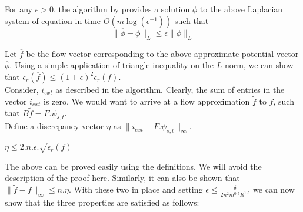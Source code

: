 \documentclass[BTech]{iitmdiss}
\begin{document}
	    \begin{thm2}
	      For any $\epsilon > 0$, the algorithm by \cite{DBLP:journals/corr/abs-1003-2958} provides a solution $\overline{\phi}$ to the above Laplacian
	      system of equation in time $\tilde{O}(m \log(\epsilon^{-1}))$ such that 
	      $$\| \overline{\phi} - \phi \| _L \leq \epsilon \| \phi \|_L$$
	      
	    \end{thm2}
	    
	    Let $\overline{f}$ be the flow vector corresponding to the above approximate potential vector $\overline{\phi}$. Using a simple application
	    of triangle inequality on the $L$-norm, we can show that $\epsilon_r(\overline{f}) \leq (1+\epsilon)^2 \epsilon_r(f)$. \\
	    
	    Consider, $i_{ext}$ as described in the algorithm. Clearly, the sum of entries in the vector $i_{ext}$ is zero. We would want to arrive at 
	    a flow approximation $\tilde{f}$ to $\overline{f}$, such that $B \tilde{f} = F.\psi_{s,t}$. \\
	    
	    Define a discrepancy vector $\eta$ as $\| i_{ext} - F.\psi_{s,t} \|_{\infty}$. \\
	    
	    \begin{thm2}
	      $\eta \leq 2.n.\epsilon.\sqrt{\epsilon_r(f)}$
	    \end{thm2}
	    
	    The above can be proved easily using the definitions. We will avoid the description of the proof here. Similarly, it can also be shown that 
	    $\| \tilde{f} - \overline{f} \|_{\infty} \leq n.\eta$. With these two in place and setting $\epsilon \leq \frac{\delta}{2n^2m^{0.5}R^{1.5}}$
	    we can now show that the three properties are satisfied as follows:
	    
\end{document}
